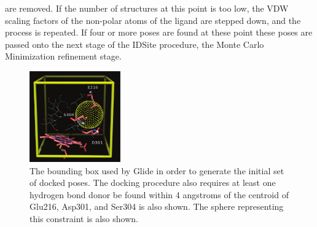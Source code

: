 are removed.
If the number of structures at this point is too low, the VDW scaling factors of the non-polar atoms of the ligand are stepped down, and the process is repeated.
If four or more poses are found at these point these poses are passed onto the next stage of the IDSite procedure, the Monte Carlo Minimization refinement stage.

\begin{figure}[h]
\centering
\includegraphics[width=0.35\textwidth]{figures/idsite/glide.png}
\caption{The bounding box used by Glide in order to generate the initial set of docked poses.
The docking procedure also requires at least one hydrogen bond donor be found within 4 angstroms of the centroid of Glu216, Asp301, and Ser304 is also shown.
The sphere representing this constraint is also shown.}
\label{fig:idsite_glide}
\end{figure}


